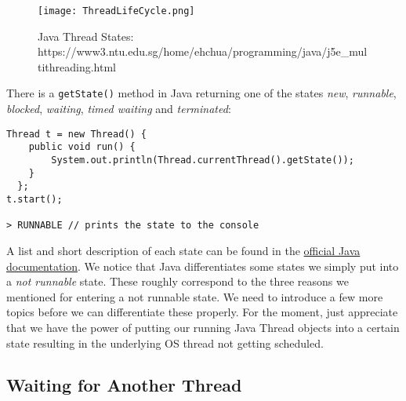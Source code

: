 \documentclass[main.tex]{subfiles}
\begin{document}
\begin{figure}[H]
    \centering
    \texttt{[image: ThreadLifeCycle.png]}
    \caption{Java Thread States: https://www3.ntu.edu.sg/home/ehchua/programming/java/j5e\_multithreading.html}
\end{figure}
There is a \texttt{getState()} method in Java returning one of the states \textit{new}, \textit{runnable}, \textit{blocked}, \textit{waiting}, \textit{timed waiting} and \textit{terminated}:
\begin{verbatim}
Thread t = new Thread() {
    public void run() {
        System.out.println(Thread.currentThread().getState());
    }
  };
t.start();

> RUNNABLE // prints the state to the console
\end{verbatim}
A list and short description of each state can be found in the \href{https://docs.oracle.com/en/java/javase/17/docs/api/java.base/java/lang/Thread.State.html}{official Java documentation}. We notice that Java differentiates some states we simply put into a \textit{not runnable} state. These roughly correspond to the three reasons we mentioned for entering a not runnable state. We need to introduce a few more topics before we can differentiate these properly. For the moment, just appreciate that we have the power of putting our running Java Thread objects into a certain state resulting in the underlying OS thread not getting scheduled.

\subsection{Waiting for Another Thread}
\end{document}
